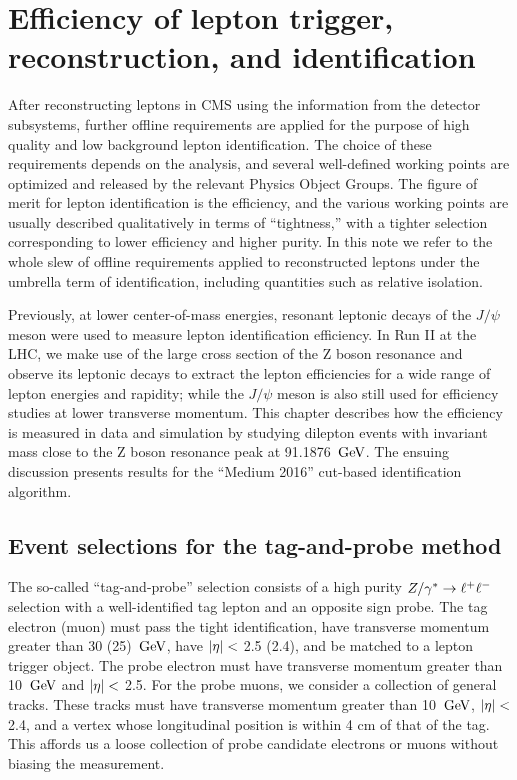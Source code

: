 \chapter{Efficiency of lepton trigger, reconstruction, and identification}
\label{chap:efficiency}
After reconstructing leptons in CMS using the information from the detector subsystems,
further offline requirements are applied for the purpose of high quality and low background lepton identification.
The choice of these requirements depends on the analysis, and several well-defined working points are optimized
and released by the relevant Physics Object Groups. The figure of merit for lepton identification is the efficiency,
and the various working points are usually described qualitatively in terms of ``tightness,''
with a tighter selection corresponding to lower efficiency and higher purity.
In this note we refer to the whole slew of offline requirements applied to reconstructed leptons under the umbrella term of identification, including quantities such as relative isolation.

Previously, at lower center-of-mass energies, resonant leptonic decays of the $J/\psi$ meson were used to measure lepton identification efficiency.
In Run II at the LHC, we make use of the large cross section of the Z boson resonance and observe its leptonic decays to extract the lepton efficiencies for a wide range of lepton energies and rapidity;
while the $J/\psi$ meson is also still used for efficiency studies at lower transverse momentum.
This chapter describes how the efficiency is measured in data and simulation by studying dilepton events with invariant mass close to the Z boson resonance peak at 91.1876 $\,\text{Ge\hspace{-.08em}V}$.
The ensuing discussion presents results for the ``Medium 2016'' cut-based identification algorithm.

\section{Event selections for the tag-and-probe method}
\label{sec:tnpsel}
The so-called ``tag-and-probe'' selection consists of a high purity $Z/\gamma^*\to\ell^+\ell^-$ selection with a
well-identified tag lepton and an opposite sign probe.
The tag electron (muon) must pass the tight identification, have transverse momentum greater than 30 (25) $\,\text{Ge\hspace{-.08em}V}$, 
have $\lvert \eta \rvert<$ 2.5 (2.4), and be matched to a lepton trigger object.
The probe electron must have transverse momentum greater than 10 $\,\text{Ge\hspace{-.08em}V}$ and $\lvert \eta \rvert<$ 2.5.
For the probe muons, we consider a collection of general tracks. These tracks must have transverse momentum 
greater than 10 $\,\text{Ge\hspace{-.08em}V}$, $\lvert \eta \rvert<$ 2.4, and a vertex whose longitudinal position is within 4 cm of that of the tag.
This affords us a loose collection of probe candidate electrons or muons without biasing the measurement.

